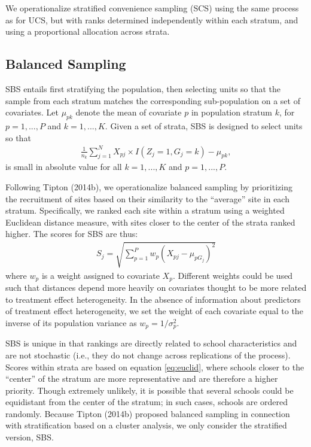 \documentclass[
  english,
  man,floatsintext]{apa6}
\begin{document}
We operationalize stratified convenience sampling (SCS) using the same process as for UCS, but with ranks determined independently within each stratum, and using a proportional allocation across strata.

\hypertarget{balanced-sampling}{%
\subsection{Balanced Sampling}\label{balanced-sampling}}

SBS entails first stratifying the population, then selecting units so that the sample from each stratum matches the corresponding sub-population on a set of covariates. Let \(\mu_{p k}\) denote the mean of covariate \(p\) in population stratum \(k\), for \(p = 1,...,P\) and \(k = 1,...,K\). Given a set of strata, SBS is designed to select units so that
\begin{align}
\frac{1}{n_k} \sum_{j=1}^N X_{pj} \times I\left(Z_j = 1, G_j = k\right) - \mu_{p k},
\end{align}
is small in absolute value for all \(k = 1,...,K\) and \(p = 1,...,P\).

Following Tipton (2014b), we operationalize balanced sampling by prioritizing the recruitment of sites based on their similarity to the ``average'' site in each stratum.
Specifically, we ranked each site within a stratum using a weighted Euclidean distance measure, with sites closer to the center of the strata ranked higher. The scores for SBS are thus:
\begin{align} \label{eq:euclid}
S_j = \sqrt{\sum^P_{p=1}w_p(X_{pj} - \mu_{p G_j})^2}
\end{align}
where \(w_p\) is a weight assigned to covariate \(X_p\). Different weights could be used such that distances depend more heavily on covariates thought to be more related to treatment effect heterogeneity. In the absence of information about predictors of treatment effect heterogeneity, we set the weight of each covariate equal to the inverse of its population variance as \(w_p = 1/\sigma^2_p\).

SBS is unique in that rankings are directly related to school characteristics and are not stochastic (i.e., they do not change across replications of the process).
Scores within strata are based on equation \eqref{eq:euclid}, where schools closer to the ``center'' of the stratum are more representative and are therefore a higher priority. Though extremely unlikely, it is possible that several schools could be equidistant from the center of the stratum; in such cases, schools are ordered randomly. Because Tipton (2014b) proposed balanced sampling in connection with stratification based on a cluster analysis, we only consider the stratified version, SBS.
\end{document}
